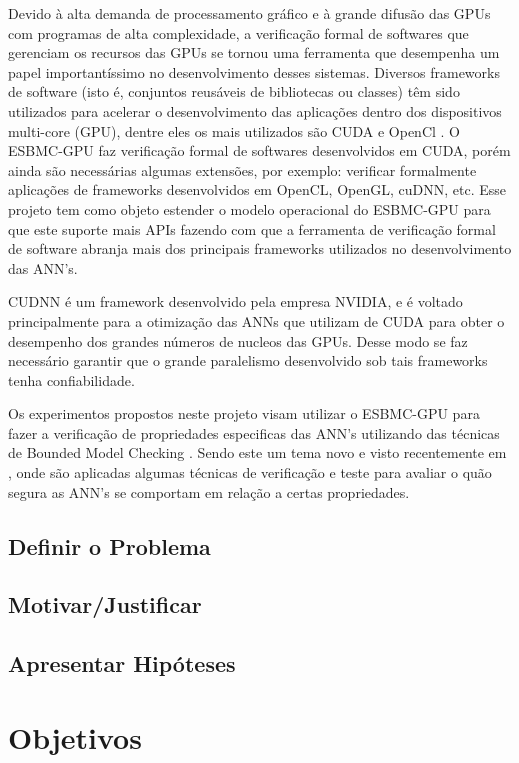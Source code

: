  Devido à alta demanda de processamento gráfico e à grande difusão das GPUs com programas de alta complexidade, a verificação formal de softwares que gerenciam os recursos das GPUs se tornou uma ferramenta que desempenha um papel importantíssimo no desenvolvimento desses sistemas. Diversos frameworks de software (isto é, conjuntos reusáveis de bibliotecas ou classes) têm sido utilizados para acelerar o desenvolvimento das aplicações dentro dos dispositivos multi-core (GPU), dentre eles os mais utilizados são CUDA e OpenCl \cite{karimi2010}. O ESBMC-GPU faz verificação formal de softwares desenvolvidos em CUDA, porém ainda são necessárias algumas extensões, por exemplo: verificar formalmente aplicações de frameworks desenvolvidos em OpenCL, OpenGL, cuDNN, etc. Esse projeto tem como objeto estender o modelo operacional do ESBMC-GPU para que este suporte mais APIs fazendo com que a ferramenta de verificação formal de software abranja mais dos principais frameworks utilizados no desenvolvimento das ANN's.
 
  CUDNN é um framework desenvolvido pela empresa NVIDIA, e é voltado principalmente para a otimização das ANNs que utilizam de CUDA para obter o desempenho dos grandes números de nucleos das GPUs. Desse modo se faz necessário garantir que o grande paralelismo desenvolvido sob tais frameworks tenha confiabilidade.

	Os experimentos propostos neste projeto visam utilizar o ESBMC-GPU para fazer a verificação de propriedades especificas das ANN's utilizando das técnicas de Bounded Model Checking \cite{clarke2001}. Sendo este um tema novo e visto recentemente em \cite{marta2016,kroening2018}, onde são aplicadas algumas técnicas de verificação e teste para avaliar o quão segura as ANN's se comportam em relação a certas propriedades.
    
\subsection{Definir o Problema}
\subsection{Motivar/Justificar}
\subsection{Apresentar Hipóteses}
\section{Objetivos}
